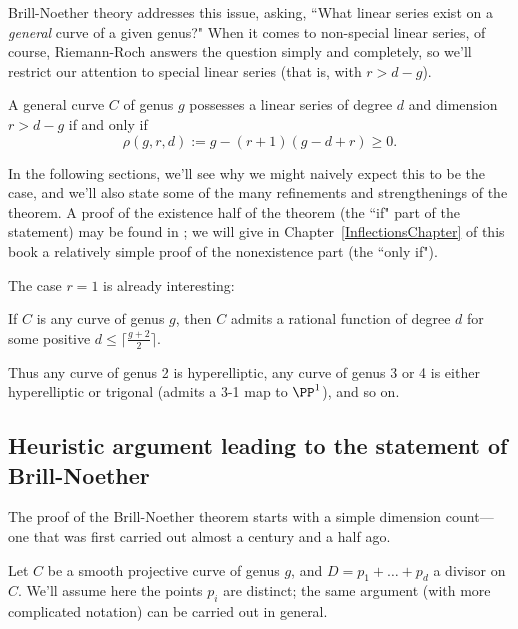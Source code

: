 Brill-Noether theory addresses this issue, asking, ``What linear series exist on a \emph{general} curve of a given genus?" When it comes to non-special linear series, of course, Riemann-Roch answers the question simply and completely, so we'll restrict our attention to special linear series (that is, with $r > d - g$). 

\begin{theorem}\label{basic BN}
A general curve $C$ of genus $g$  possesses a linear series of degree $d$ and dimension $r>d-g$ if and only if
$$
 \rho(g,r,d) := g - (r+1)(g-d+r) \geq 0.
$$
\end{theorem}


In the following sections, we'll see why we might naively expect this to be the case, and we'll also state some of the many refinements and strengthenings of the theorem.  A proof of the existence half of the theorem (the ``if" part of the statement) may be found in \cite[Theorem ****]{3264};  we will give in Chapter~\ref{InflectionsChapter} of this book a relatively simple proof of the nonexistence part (the ``only if"). 

The case $r=1$ is already interesting:

\begin{corollary}
If $C$ is any curve of genus $g$, then $C$ admits a rational function of degree $d$ for some positive $d \leq \lceil \frac{g+2}{2}\rceil$.
\end{corollary}

Thus any curve of genus 2 is hyperelliptic, any curve of genus 3 or 4 is either hyperelliptic or trigonal  (admits a 3-1 map to $\PP^1$), and so on.


\subsection{Heuristic argument leading to the statement of Brill-Noether}

The proof of the Brill-Noether theorem starts with a simple dimension count---one that was first carried out almost a century and a half ago. 

Let $C$ be a smooth projective curve of genus $g$, and $D = p_1 + \dots + p_d$ a divisor on $C$. We'll assume here the points $p_i$ are distinct; the same argument (with  more complicated notation) can be carried out in general.

